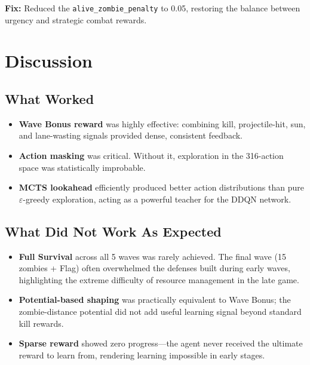 \documentclass[conference]{IEEEtran}
\begin{document}
\textbf{Fix:} Reduced the \texttt{alive\_zombie\_penalty} to 0.05, restoring the balance between urgency and strategic combat rewards.

\section{Discussion}

\subsection{What Worked}
\begin{itemize}[leftmargin=*,nosep]
    \item \textbf{Wave Bonus reward} was highly effective: combining kill, projectile-hit, sun, and lane-wasting signals provided dense, consistent feedback.
    \item \textbf{Action masking} was critical. Without it, exploration in the 316-action space was statistically improbable.
    \item \textbf{MCTS lookahead} efficiently produced better action distributions than pure $\varepsilon$-greedy exploration, acting as a powerful teacher for the DDQN network.
\end{itemize}

\subsection{What Did Not Work As Expected}
\begin{itemize}[leftmargin=*,nosep]
    \item \textbf{Full Survival} across all 5 waves was rarely achieved. The final wave (15 zombies + Flag) often overwhelmed the defenses built during early waves, highlighting the extreme difficulty of resource management in the late game.
    \item \textbf{Potential-based shaping} was practically equivalent to Wave Bonus; the zombie-distance potential did not add useful learning signal beyond standard kill rewards.
    \item \textbf{Sparse reward} showed zero progress---the agent never received the ultimate reward to learn from, rendering learning impossible in early stages.
\end{itemize}

\end{document}
